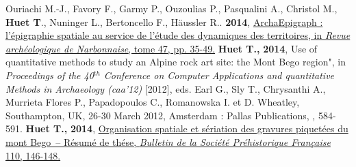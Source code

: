 \documentclass[11pt]{report} %
\begin{document}
\smallbreak
Ouriachi M.-J., Favory F., Garmy P., Ouzoulias P., Pasqualini A., Christol M., \textbf{Huet T}., Nuninger L., Bertoncello F., H\"{a}ussler R.. \textbf{2014}, \href{https://www.persee.fr/doc/ran_0557-7705_2014_num_47_1_1897}{ArchaEpigraph : l'\'{e}pigraphie spatiale au service de l'\'{e}tude des dynamiques des territoires, in \textit{Revue arch\'{e}ologique de Narbonnaise}, tome 47, pp. 35-49.}
\smallbreak
\textbf{Huet T.,} \textbf{2014}, Use of quantitative methods to study an Alpine rock art site: the Mont Bego region", in \textit{Proceedings of the 40${}^{th}$ Conference on Computer Applications and quantitative Methods in Archaeology (caa'12) }[2012], eds. Earl G., Sly T., Chrysanthi A., Murrieta Flores P., Papadopoulos C., Romanowska I. et D. Wheatley, Southampton, UK, 26-30 March 2012, Amsterdam : Pallas Publications, , 584-591.
\smallbreak
\textbf{Huet T.,} \textbf{2014}, \href{https://www.persee.fr/doc/bspf_0249-7638_2013_num_110_1_14242}{Organisation spatiale et s\'{e}riation des gravures piquet\'{e}es du mont Bego~-- R\'{e}sum\'{e} de th\'{e}se, \textit{Bulletin de la Soci\'{e}t\'{e} Pr\'{e}historique Fran\c{c}aise} 110, 146-148.}
\end{document}
